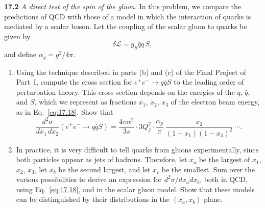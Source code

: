 \textbf{17.2} \emph{A direct test of the spin of the gluon.}  In this
problem, we compare the predictions of QCD with those of a model in which the
interaction of quarks is mediated by a scalar boson.  Let the coupling of the
scalar gluon to quarks be given by
\begin{equation}
  \delta\mathcal{L} = g_S\bar{q}q\,S ,
\end{equation}
and define $\alpha_g = g^2/4\pi$.
\begin{enumerate}[label=(\alph*)]
  \item Using the technique described in parts (b) and (c) of the Final
    Project of Part~I, compute the cross section for $e^{+}e^{-}\to q\bar{q}S$
    to the leading order of perturbation theory.  This cross section depends
    on the energies of the $q$, $\bar{q}$, and $S$, which we represent as
    fractions $x_1$, $x_2$, $x_3$ of the electron beam energy, as in
    Eq.~\eqref{eq:17.18}.  Show that
    \begin{equation}
      \frac{d^2\sigma}{dx_1\,dx_2}(e^{+}e^{-}\to q\bar{q}S)
      = \frac{4\pi\alpha^2}{3s}\cdot 3Q_f^2\cdot
        \frac{\alpha_g}{\pi}\ \frac{x_2}{(1-x_1)(1-x_3)^2}\ \cdots .
    \end{equation}
  \item In practice, it is very difficult to tell quarks from gluons
    experimentally, since both particles appear as jets of hadrons.
    Therefore, let $x_a$ be the largest of $x_1$, $x_2$, $x_3$, let $x_b$ be
    the second largest, and let $x_c$ be the smallest.  Sum over the various
    possibilities to derive an expression for $d^2\sigma/dx_adx_b$, both in
    QCD, using Eq.~\eqref{eq:17.18}, and in the scalar gluon model.  Show
    that these models can be distinguished by their distributions in the
    $(x_a, x_b)$ plane.
\end{enumerate}

